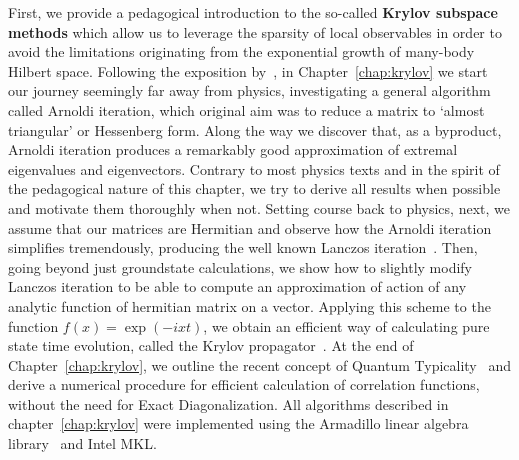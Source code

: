 First, we provide a pedagogical introduction to the so-called \textbf{Krylov subspace methods} which allow
us to leverage the sparsity of local observables
in order to avoid the limitations originating from the exponential growth of many-body Hilbert space.
Following the exposition by~\textcite{Trefethen1997}, in Chapter~\ref{chap:krylov} we start our journey seemingly far away from
physics, investigating a general algorithm called Arnoldi iteration, which original aim was to reduce
a matrix to `almost triangular' or Hessenberg form. Along the way we discover that, as a byproduct,
Arnoldi iteration produces a remarkably good approximation of extremal eigenvalues and eigenvectors. Contrary
to most physics texts and in the spirit of the pedagogical nature of this chapter, we try to derive all results when possible
and motivate them thoroughly when not. Setting course back to physics, next, we assume that our matrices are
Hermitian and observe how the Arnoldi iteration simplifies tremendously, producing the well known
Lanczos iteration~\autocite{Sandvik2010}. Then, going beyond just groundstate calculations, we show how to slightly
modify Lanczos iteration to be able to compute an approximation of action of any analytic function of hermitian
matrix on a vector. Applying this scheme to the function \(f(x) = \exp\left(-i x t\right)\), we obtain an efficient
way of calculating pure state time evolution, called the Krylov propagator~\autocite{Park1986}.
At the end of Chapter~\ref{chap:krylov}, we outline the recent concept of Quantum Typicality~\autocite{Bartsch2009}
and derive a numerical procedure for efficient calculation of correlation functions, without the need for Exact
Diagonalization. All algorithms described in chapter~\ref{chap:krylov} were implemented using
the Armadillo linear algebra library~\autocite{Sanderson2016} and Intel MKL.


